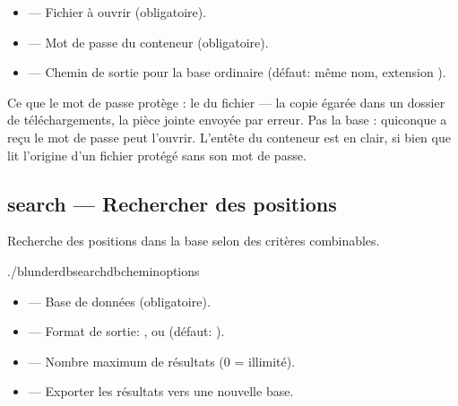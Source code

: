 \documentclass[letterpaper,10pt,french]{sphinxmanual}
\begin{document}
\sphinxAtStartPar
{}
\begin{itemize}
\item {} 
\sphinxAtStartPar
{} — Fichier  à ouvrir (obligatoire).

\item {} 
\sphinxAtStartPar
{} — Mot de passe du conteneur (obligatoire).

\item {} 
\sphinxAtStartPar
{} — Chemin de sortie pour la base ordinaire (défaut: même nom,
extension ).

\end{itemize}

\sphinxAtStartPar
Ce que le mot de passe protège : le  du fichier — la copie égarée
dans un dossier de téléchargements, la pièce jointe envoyée par erreur. Pas la
base : quiconque a reçu le mot de passe peut l’ouvrir. L’en\sphinxhyphen{}tête du conteneur
est en clair, si bien que  lit l’origine d’un fichier
protégé sans son mot de passe.


\subsection{search — Rechercher des positions}
\label{\detokenize{cli:search-rechercher-des-positions}}
\sphinxAtStartPar
Recherche des positions dans la base selon des critères combinables.

\begin{sphinxVerbatim}[commandchars=\\\{\}]
./blunderdbsearch\PYGZhy{}\PYGZhy{}db\PYGZlt{}chemin\PYGZgt{}\PYG{o}{[}options\PYG{o}{]}
\end{sphinxVerbatim}

\sphinxAtStartPar
{}
\begin{itemize}
\item {} 
\sphinxAtStartPar
{} — Base de données (obligatoire).

\item {} 
\sphinxAtStartPar
{} — Format de sortie: ,  ou  (défaut: ).

\item {} 
\sphinxAtStartPar
{} — Nombre maximum de résultats (0 = illimité).

\item {} 
\sphinxAtStartPar
{} — Exporter les résultats vers une nouvelle base.

\end{itemize}
\end{document}
